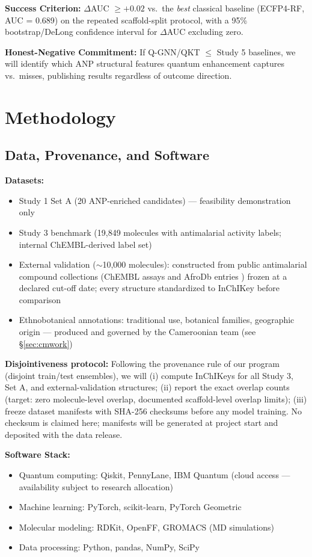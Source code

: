 \documentclass[11pt,a4paper]{article}
\begin{document}
\textbf{Success Criterion:} $\Delta$AUC $\geq +0.02$ vs.\ the \textit{best} classical baseline (ECFP4-RF, AUC = 0.689) on the repeated scaffold-split protocol, with a 95\% bootstrap/DeLong confidence interval \cite{delong1988} for $\Delta$AUC excluding zero.

\textbf{Honest-Negative Commitment:} If Q-GNN/QKT $\leq$ Study 5 baselines, we will identify which ANP structural features quantum enhancement captures vs.\ misses, publishing results regardless of outcome direction.

\section{Methodology}

\subsection{Data, Provenance, and Software}
\label{sec:data}

\textbf{Datasets:}
\begin{itemize}
    \item Study 1 Set A (20 ANP-enriched candidates) --- feasibility demonstration only
    \item Study 3 benchmark (19,849 molecules with antimalarial activity labels; internal ChEMBL-derived label set) \cite{mendez2019}
    \item External validation ($\sim$10,000 molecules): constructed from public antimalarial compound collections (ChEMBL assays and AfroDb entries \cite{ntiekang2013}) frozen at a declared cut-off date; every structure standardized to InChIKey before comparison
    \item Ethnobotanical annotations: traditional use, botanical families, geographic origin --- produced and governed by the Cameroonian team (see \S\ref{sec:cmwork})
\end{itemize}

\textbf{Disjointiveness protocol:} Following the provenance rule of our program (disjoint train/test ensembles), we will (i) compute InChIKeys for all Study 3, Set A, and external-validation structures; (ii) report the exact overlap counts (target: zero molecule-level overlap, documented scaffold-level overlap limits); (iii) freeze dataset manifests with SHA-256 checksums before any model training. No checksum is claimed here; manifests will be generated at project start and deposited with the data release.

\textbf{Software Stack:}
\begin{itemize}
    \item Quantum computing: Qiskit, PennyLane, IBM Quantum (cloud access --- availability subject to research allocation)
    \item Machine learning: PyTorch, scikit-learn, PyTorch Geometric
    \item Molecular modeling: RDKit, OpenFF, GROMACS (MD simulations)
    \item Data processing: Python, pandas, NumPy, SciPy
\end{itemize}
\end{document}
